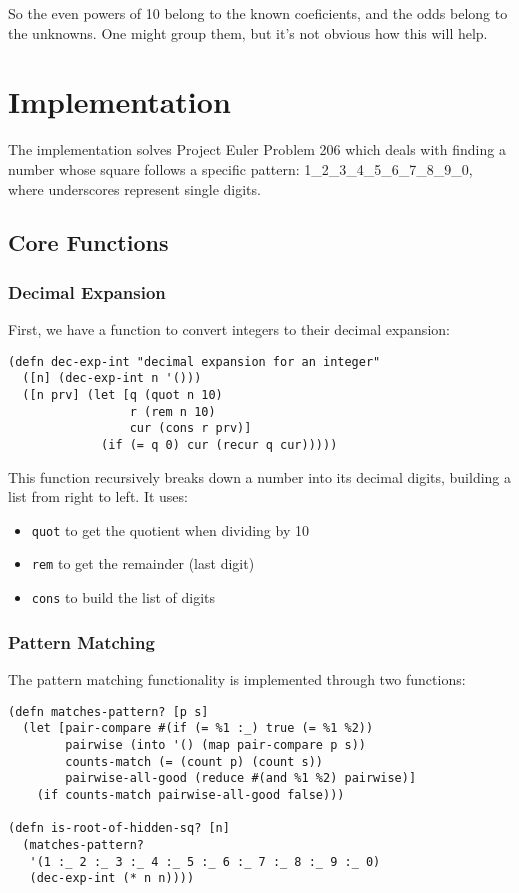 \documentclass{article}
\begin{document}
So the even powers of 10 belong to the known coeficients, and the odds belong to the unknowns.  One might group
them, but it's not obvious how this will help.

\section{Implementation}

The implementation solves Project Euler Problem 206 which deals with finding a number whose square follows a specific pattern: 1_2_3_4_5_6_7_8_9_0, where underscores represent single digits.

\subsection{Core Functions}

\subsubsection{Decimal Expansion}
First, we have a function to convert integers to their decimal expansion:

\begin{lstlisting}
(defn dec-exp-int "decimal expansion for an integer"
  ([n] (dec-exp-int n '()))
  ([n prv] (let [q (quot n 10) 
                 r (rem n 10)
                 cur (cons r prv)]
             (if (= q 0) cur (recur q cur)))))
\end{lstlisting}

This function recursively breaks down a number into its decimal digits, building a list from right to left. It uses:
\begin{itemize}
    \item \texttt{quot} to get the quotient when dividing by 10
    \item \texttt{rem} to get the remainder (last digit)
    \item \texttt{cons} to build the list of digits
\end{itemize}

\subsubsection{Pattern Matching}
The pattern matching functionality is implemented through two functions:

\begin{lstlisting}
(defn matches-pattern? [p s]
  (let [pair-compare #(if (= %1 :_) true (= %1 %2))
        pairwise (into '() (map pair-compare p s))
        counts-match (= (count p) (count s))
        pairwise-all-good (reduce #(and %1 %2) pairwise)]
    (if counts-match pairwise-all-good false)))

(defn is-root-of-hidden-sq? [n]
  (matches-pattern?
   '(1 :_ 2 :_ 3 :_ 4 :_ 5 :_ 6 :_ 7 :_ 8 :_ 9 :_ 0)
   (dec-exp-int (* n n))))
\end{lstlisting}
\end{document}
